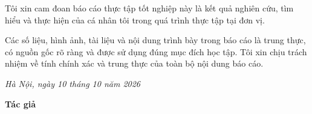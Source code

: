 
Tôi xin cam đoan báo cáo thực tập tốt nghiệp này là kết quả nghiên cứu, tìm hiểu và thực hiện của cá nhân tôi trong quá trình thực tập tại đơn vị.

Các số liệu, hình ảnh, tài liệu và nội dung trình bày trong báo cáo là trung thực, có nguồn gốc rõ ràng và được sử dụng đúng mục đích học tập. Tôi xin chịu trách nhiệm về tính chính xác và trung thực của toàn bộ nội dung báo cáo.

\vspace{1cm}

\begin{flushright}
\begin{minipage}{8cm}
\centering
\textit{Hà Nội, ngày 10 tháng 10 năm 2026}

\vspace{0.5cm}

\textbf{Tác giả}

\vspace{2cm}

\textbf{\TenSinhVien}
\end{minipage}
\end{flushright}
